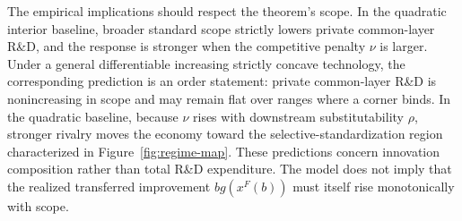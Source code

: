 The empirical implications should respect the theorem's scope. In the quadratic interior baseline, broader standard scope strictly lowers private common-layer R\&D, and the response is stronger when the competitive penalty $\nu$ is larger. Under a general differentiable increasing strictly concave technology, the corresponding prediction is an order statement: private common-layer R\&D is nonincreasing in scope and may remain flat over ranges where a corner binds. In the quadratic baseline, because $\nu$ rises with downstream substitutability $\rho$, stronger rivalry moves the economy toward the selective-standardization region characterized in Figure~\ref{fig:regime-map}. These predictions concern innovation composition rather than total R\&D expenditure. The model does not imply that the realized transferred improvement $b g(x^F(b))$ must itself rise monotonically with scope.
